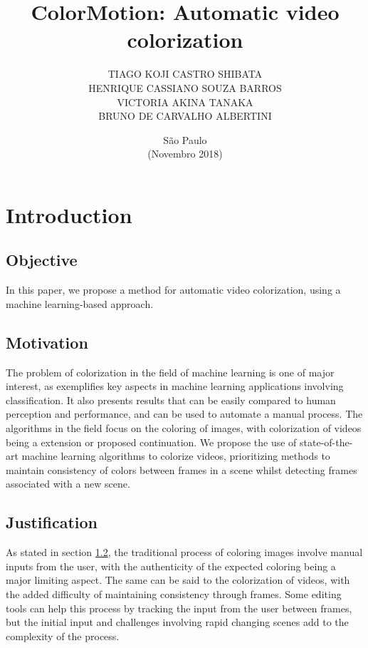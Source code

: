\documentclass[12pt,openright,twoside,a4paper,brazil]{abntex2}
\author{TIAGO KOJI CASTRO SHIBATA\\
HENRIQUE CASSIANO SOUZA BARROS\\
VICTORIA AKINA TANAKA\\
BRUNO DE CARVALHO ALBERTINI}
\title{ColorMotion: Automatic video colorization}
\date{São Paulo\\(Novembro 2018)}
\begin{document}
\imprimircapa
\imprimirfalsafolhaderosto
\imprimirfolhaderosto

\maketitle

\section{Introduction}

\subsection{Objective}
In this paper, we propose a method for automatic video colorization, using a machine learning-based approach.

\subsection{Motivation} \label{sec:Motivation}
The problem of colorization in the field of machine learning is one of major interest, as exemplifies key aspects in machine learning applications involving classification. It also presents results that can be easily compared to human perception and performance, and can be used to automate a manual process. The algorithms in the field focus on the coloring of images, with colorization of videos being a extension or proposed continuation. We propose the use of state-of-the-art machine learning algorithms to colorize videos, prioritizing methods to maintain consistency of colors between frames in a scene whilst detecting frames associated with a new scene.

\subsection{Justification}
As stated in section \ref{sec:Motivation}, the traditional process of coloring images involve manual inputs from the user, with the authenticity of the expected coloring being a major limiting aspect.
The same can be said to the colorization of videos, with the added difficulty of maintaining consistency through frames. Some editing tools can help this process by tracking the input from the user between frames, but the initial input and challenges involving rapid changing scenes add to the complexity of the process.
\end{document}

